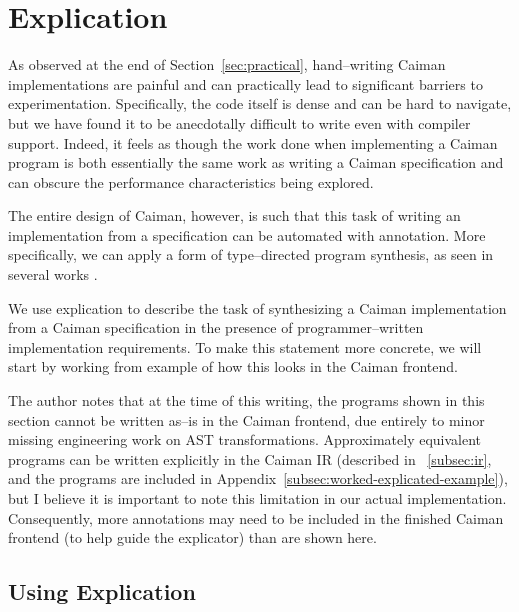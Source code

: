 \section{Explication}
\label{sec:explication}

As observed at the end of Section~\ref{sec:practical}, hand--writing Caiman implementations are painful and can practically lead to significant barriers to experimentation.  Specifically, the code itself is dense and can be hard to navigate, but we have found it to be anecdotally difficult to write even with compiler support.  Indeed, it feels as though the work done when implementing a Caiman program is both essentially the same work as writing a Caiman specification and can obscure the performance characteristics being explored.

The entire design of Caiman, however, is such that this task of writing an implementation from a specification can be automated with annotation.  More specifically, we can apply a form of type--directed program synthesis, as seen in several works .

We use explication to describe the task of synthesizing a Caiman implementation from a Caiman specification in the presence of programmer--written implementation requirements.  To make this statement more concrete, we will start by working from example of how this looks in the Caiman frontend.

The author notes that at the time of this writing, the programs shown in this section cannot be written as--is in the Caiman frontend, due entirely to minor missing engineering work on AST transformations.  Approximately equivalent programs can be written explicitly in the Caiman IR (described in ~\ref{subsec:ir}, and the programs are included in Appendix~\ref{subsec:worked-explicated-example}), but I believe it is important to note this limitation in our actual implementation.  Consequently, more annotations may need to be included in the finished Caiman frontend (to help guide the explicator) than are shown here.

\subsection{Using Explication}

